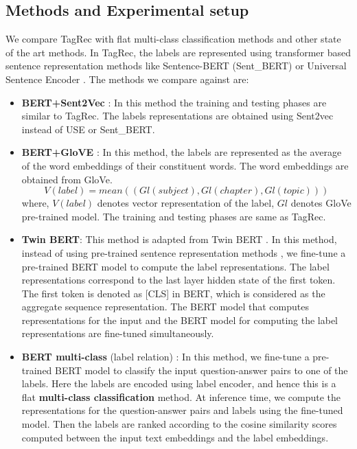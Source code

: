 \documentclass[runningheads, envcountsame, a4paper]{llncs}
\begin{document}
\subsection{Methods and Experimental setup}
 We compare TagRec with flat multi-class classification methods and other state of the art methods. In TagRec, the labels are represented using transformer based sentence representation methods like Sentence-BERT (Sent\_BERT) \cite{reimers-gurevych-2019-sentence} or Universal Sentence Encoder \cite{cer-etal-2018-universal}.
The methods we compare against are:
\let\labelitemi\labelitemii
\begin{itemize}
  \setlength\itemsep{0.5em}

    \item \textbf{BERT+Sent2Vec} : In this method the training and testing phases are similar to TagRec. The labels representations are obtained using Sent2vec \cite{pagliardini2017unsupervised} instead of USE or Sent\_BERT.
    \item \textbf{BERT+GloVE} : In this method, the labels are represented as the average of the word embeddings of their constituent words. The word embeddings are obtained from GloVe.
    \setlength{\parindent}{0pt}
    \[V(label) = mean((Gl(subject),Gl(chapter),Gl(topic)))\]
    where, $V(label)$ denotes vector representation of the label, $Gl$ denotes GloVe pre-trained model. The training and testing phases are same as TagRec.

    \item \textbf{Twin BERT}:  This method is adapted from Twin BERT \cite{twinbert}. In this method, instead of using pre-trained sentence representation methods , we fine-tune a pre-trained BERT model to compute the label representations. The label representations correspond to the last layer hidden state of the first token. The first token is denoted as [CLS] in BERT, which is considered as the aggregate sequence representation. The BERT model that computes representations for the input and the BERT model for computing the label representations are fine-tuned simultaneously. 


    \item \textbf{BERT multi-class}  (label relation)  \cite{xumulti}: In this method, we fine-tune a pre-trained BERT model to classify the input question-answer pairs to one of the labels. Here the labels are encoded using label encoder, and hence this is a flat \textbf{multi-class classification} method. At inference time, we compute the representations for the question-answer pairs and labels using the fine-tuned model. Then the labels are ranked according to the cosine similarity scores computed between the input text embeddings and the label embeddings. 
           


\end{itemize}
\end{document}
